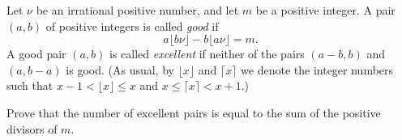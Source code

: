 Let $\nu$ be an irrational positive number, and let $m$ be a positive integer. A pair $(a, b)$ of positive integers is called \emph{good} if
\[ a\lfloor b\nu \rfloor - b\lfloor a\nu \rfloor = m. \]
A good pair $(a, b)$ is called \emph{excellent} if neither of the pairs $(a-b, b)$ and $(a, b-a)$ is good. (As usual, by $\lfloor x \rfloor$ and $\lceil x \rceil$ we denote the integer numbers such that $x - 1 < \lfloor x \rfloor \leq x$ and $x \leq \lceil x \rceil < x + 1$.)

Prove that the number of excellent pairs is equal to the sum of the positive divisors of $m$.
